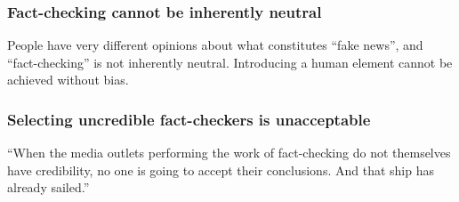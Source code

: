 \subsubsection{Fact-checking cannot be inherently neutral}

People have very different opinions about what constitutes ``fake news'', and ``fact-checking'' is not inherently neutral. Introducing a human element cannot be achieved without bias. \cite{vox_sentences_fn} \cite{inc_fb_transparency}

\subsubsection{Selecting uncredible fact-checkers is unacceptable}

``When the media outlets performing the work of fact-checking do not themselves have credibility, no one is going to accept their conclusions. And that ship has already sailed.'' \cite{vox_sentences_fn}

